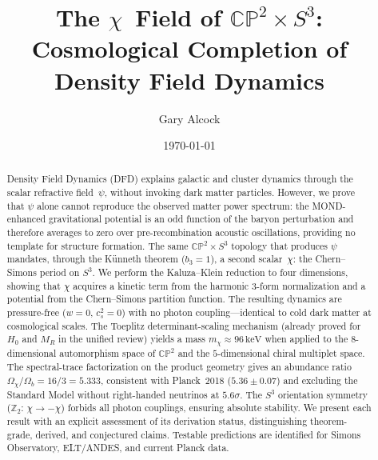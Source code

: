 \documentclass[aps,prd,twocolumn,superscriptaddress,showpacs,floatfix,nofootinbib]{revtex4-2}
\theoremstyle{definition}
\theoremstyle{remark}
\newcommand{\CP}{\mathbb{CP}}
\newcommand{\Sph}{S}
\newcommand{\keV}{\,\mathrm{keV}}
\begin{document}
\title{The $\chi$~Field of $\CP^2\times\Sph^3$:\\
Cosmological Completion of Density Field Dynamics}

\author{Gary Alcock}

\date{\today}

\begin{abstract}
Density Field Dynamics (DFD) explains galactic and cluster
dynamics through the scalar refractive field~$\psi$, without
invoking dark matter particles. However, we prove that $\psi$
alone cannot reproduce the observed matter power spectrum:
the MOND-enhanced gravitational potential is an odd function
of the baryon perturbation and therefore averages to zero
over pre-recombination acoustic oscillations, providing no
template for structure formation. The same $\CP^2\times\Sph^3$
topology that produces $\psi$ mandates, through the K\"unneth
theorem ($b_3=1$), a second scalar~$\chi$: the Chern--Simons
period on $\Sph^3$. We perform the Kaluza--Klein reduction
to four dimensions, showing that $\chi$ acquires a kinetic
term from the harmonic $3$-form normalization and a potential
from the Chern--Simons partition function. The resulting
dynamics are pressure-free ($w=0$, $c_s^2=0$) with no
photon coupling---identical to cold dark matter at
cosmological scales. The Toeplitz determinant-scaling
mechanism (already proved for $H_0$ and $M_R$ in the
unified review) yields a mass
$m_\chi \approx 96\keV$ when applied to the
$8$-dimensional automorphism space of $\CP^2$ and
the $5$-dimensional chiral multiplet space. The spectral-trace
factorization on the product geometry gives an abundance ratio
$\Omega_\chi/\Omega_b = 16/3 = 5.333$, consistent with
Planck~2018 ($5.36\pm 0.07$) and excluding the Standard
Model without right-handed neutrinos at $5.6\sigma$. The
$\Sph^3$ orientation symmetry ($\mathbb{Z}_2$: $\chi\to-\chi$)
forbids all photon couplings, ensuring absolute stability.
We present each result with an explicit assessment of its
derivation status, distinguishing theorem-grade, derived,
and conjectured claims. Testable predictions are identified
for Simons Observatory, ELT/ANDES, and current Planck data.
\end{abstract}

\maketitle

\end{document}
